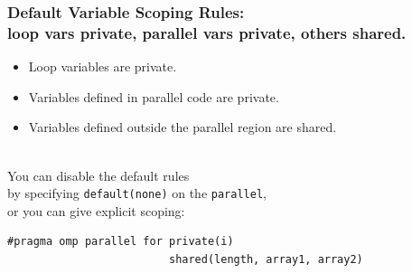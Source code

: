 
\begin{frame}[fragile]
  \frametitle{Default Variable Scoping Rules: \\
loop vars private, parallel vars private, others shared.}

\begin{changemargin}{1.5cm}
\large
\begin{itemize}
  \item Loop variables are private.
  \item Variables defined in parallel code are private.
  \item Variables defined outside the parallel region are shared.
\end{itemize}
~\\

You can disable the default rules \\
by specifying {\tt default(none)} on the {\tt parallel}, \\
or you can give explicit scoping:

\begin{lstlisting}
#pragma omp parallel for private(i) 
                         shared(length, array1, array2)
\end{lstlisting}
\end{changemargin}


\end{frame}

